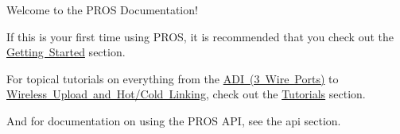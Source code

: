 Welcome to the P\+R\+OS Documentation!

If this is your first time using P\+R\+OS, it is recommended that you check out the \mbox{\hyperlink{getting-started}{Getting Started}} section.

For topical tutorials on everything from the \mbox{\hyperlink{md_docs_tutorials_topical_adi}{A\+DI (3 Wire Ports)}} to \mbox{\hyperlink{md_docs_tutorials_topical_wireless-upload}{Wireless Upload and Hot/\+Cold Linking}}, check out the \mbox{\hyperlink{tutorials}{Tutorials}} section.

And for documentation on using the P\+R\+OS A\+PI, see the api section. 